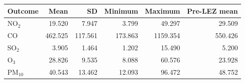 \begin{tabular}{lrrrrr}
\toprule
Outcome & Mean & SD & Minimum & Maximum & Pre-LEZ mean \\
\midrule
NO$_2$ & 19.520 & 7.947 & 3.799 & 49.297 & 29.509 \\
CO & 462.525 & 117.561 & 173.863 & 1159.354 & 550.426 \\
SO$_2$ & 3.905 & 1.464 & 1.202 & 15.490 & 5.200 \\
O$_3$ & 28.826 & 9.535 & 8.088 & 60.576 & 23.928 \\
PM$_{10}$ & 40.543 & 13.462 & 12.093 & 96.472 & 48.752 \\
\bottomrule
\end{tabular}
